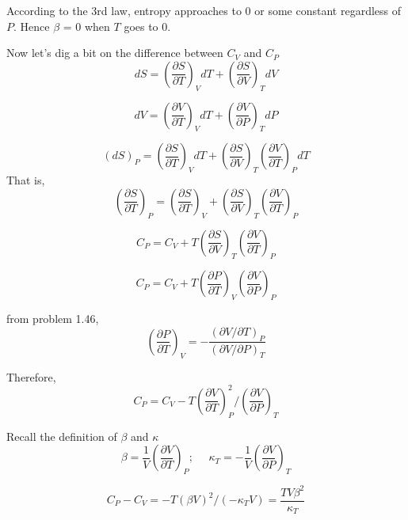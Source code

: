 According to the 3rd law, entropy approaches to 0 or some constant regardless of $P$. Hence $\beta$ = 0 when $T$ goes to 0.

Now let's dig a bit on the difference between $C_V$ and $C_P$
\begin{equation}
dS = (\frac{\partial{S}}{\partial{T}})_V dT + (\frac{\partial{S}}{\partial{V}})_T dV
\end{equation}

\begin{equation}
dV = (\frac{\partial{V}}{\partial{T}})_V dT + (\frac{\partial{V}}{\partial{P}})_T dP
\end{equation}

\begin{equation}
(dS)_P = (\frac{\partial{S}}{\partial{T}})_V dT + (\frac{\partial{S}}{\partial{V}})_T (\frac{\partial{V}}{\partial T})_P dT
\end{equation}
That is,
\begin{equation}
(\frac{\partial S}{\partial T})_P = (\frac{\partial{S}}{\partial{T}})_V + (\frac{\partial{S}}{\partial{V}})_T (\frac{\partial{V}}{\partial T})_P
\end{equation}

\begin{equation}
C_P = C_V + T(\frac{\partial{S}}{\partial{V}})_T (\frac{\partial{V}}{\partial T})_P
\end{equation}

\begin{equation}
C_P = C_V + T(\frac{\partial{P}}{\partial{T}})_V (\frac{\partial{V}}{\partial P})_P
\end{equation}

from problem 1.46,
\begin{equation}
(\frac{\partial{P}}{\partial{T}})_V = -\frac{(\partial{V}/{\partial T})_P}{(\partial{V}/{\partial P})_T}
\end{equation}

Therefore,
\begin{equation}
C_P = C_V - T(\frac{\partial{V}}{\partial{T}})^2_P / (\frac{\partial{V}}{\partial P})_T
\end{equation}

Recall the definition of $\beta$ and $\kappa$
\begin{equation}
\beta = \frac{1}{V}(\frac{\partial{V}}{\partial{T}})_P;~~~~~~ \kappa_T = -\frac{1}{V}(\frac{\partial{V}}{\partial{P}})_T
\end{equation}

\begin{equation}
C_P - C_V = -T(\beta V)^2/(-\kappa_T V) = \frac{TV\beta^2}{\kappa_T}
\end{equation}



